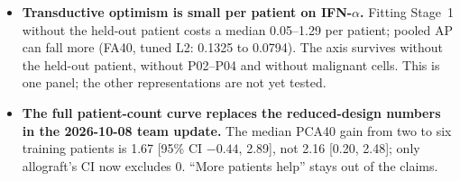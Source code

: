 \begin{itemize}
\item \textbf{Transductive optimism is small per patient on IFN-$\alpha$.} Fitting Stage~1 without the held-out patient costs a median 0.05--1.29\pp{} per patient; pooled AP can fall more (FA40, tuned L2: 0.1325 to 0.0794). The axis survives without the held-out patient, without P02--P04 and without malignant cells. This is one panel; the other representations are not yet tested. 
\item \textbf{The full patient-count curve replaces the reduced-design numbers in the 2026-10-08 team update.} The median PCA40 gain from two to six training patients is 1.67\pp{} [95\% CI $-0.44$, 2.89], not 2.16 [0.20, 2.48]; only allograft's CI now excludes 0. ``More patients help'' stays out of the claims. 
\end{itemize}
